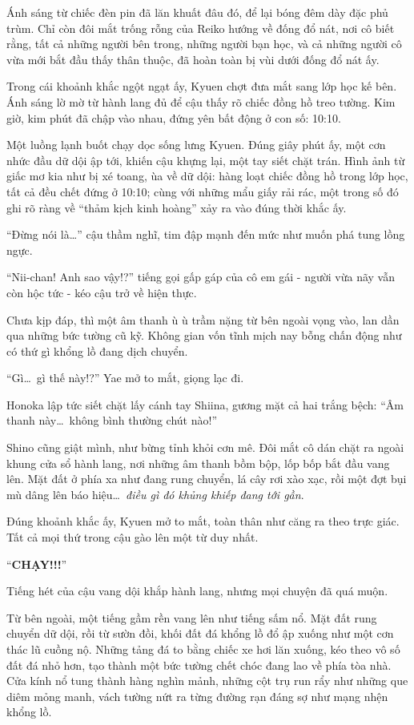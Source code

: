 \documentclass[../main.tex]{subfiles}
\begin{document}
Ánh sáng từ chiếc đèn pin đã lăn khuất đâu đó, để lại bóng đêm dày đặc phủ trùm. Chỉ còn đôi mắt trống rỗng của Reiko hướng về đống đổ nát, nơi cô biết rằng, tất cả những người bên trong, những người bạn học, và cả những người cô vừa mới bắt đầu thấy thân thuộc, đã hoàn toàn bị vùi dưới đống đổ nát ấy.

\il

Trong cái khoảnh khắc ngột ngạt ấy, Kyuen chợt đưa mắt sang lớp học kế bên. Ánh sáng lờ mờ từ hành lang đủ để cậu thấy rõ chiếc đồng hồ treo tường. Kim giờ, kim phút đã chập vào nhau, đứng yên bất động ở con số: 10:10.

Một luồng lạnh buốt chạy dọc sống lưng Kyuen. Đúng giây phút ấy, một cơn nhức đầu dữ dội ập tới, khiến cậu khựng lại, một tay siết chặt trán. Hình ảnh từ giấc mơ kia như bị xé toang, ùa về dữ dội: hàng loạt chiếc đồng hồ trong lớp học, tất cả đều chết đứng ở 10:10; cùng với những mẩu giấy rải rác, một trong số đó ghi rõ ràng về ``thảm kịch kinh hoàng'' xảy ra vào đúng thời khắc ấy.

``Đừng nói là\dots'' cậu thầm nghĩ, tim đập mạnh đến mức như muốn phá tung lồng ngực.

``Nii-chan! Anh sao vậy!?'' tiếng gọi gấp gáp của cô em gái - người vừa nãy vẫn còn hộc tức - kéo cậu trở về hiện thực.

Chưa kịp đáp, thì một âm thanh ù ù trầm nặng từ bên ngoài vọng vào, lan dần qua những bức tường cũ kỹ. Không gian vốn tĩnh mịch nay bỗng chấn động như có thứ gì khổng lồ đang dịch chuyển.

``Gì\dots\ gì thế này!?'' Yae mở to mắt, giọng lạc đi.

Honoka lập tức siết chặt lấy cánh tay Shiina, gương mặt cả hai trắng bệch: ``Âm thanh này\dots\ không bình thường chút nào!''

Shino cũng giật mình, như bừng tỉnh khỏi cơn mê. Đôi mắt cô dán chặt ra ngoài khung cửa sổ hành lang, nơi những âm thanh bồm bộp, lốp bốp bắt đầu vang lên. Mặt đất ở phía xa như đang rung chuyển, lá cây rơi xào xạc, rồi một đợt bụi mù dâng lên báo hiệu\dots\ \emph{điều gì đó khủng khiếp đang tới gần}.

Đúng khoảnh khắc ấy, Kyuen mở to mắt, toàn thân như căng ra theo trực giác. Tất cả mọi thứ trong cậu gào lên một từ duy nhất.

``{\Large{\textbf{CHẠY!!!}}}''

Tiếng hét của cậu vang dội khắp hành lang, nhưng mọi chuyện đã quá muộn.

Từ bên ngoài, một tiếng gầm rền vang lên như tiếng sấm nổ. Mặt đất rung chuyển dữ dội, rồi từ sườn đồi, khối đất đá khổng lồ đổ ập xuống như một cơn thác lũ cuồng nộ. Những tảng đá to bằng chiếc xe hơi lăn xuống, kéo theo vô số đất đá nhỏ hơn, tạo thành một bức tường chết chóc đang lao về phía tòa nhà. Cửa kính nổ tung thành hàng nghìn mảnh, những cột trụ run rẩy như những que diêm mỏng manh, vách tường nứt ra từng đường rạn đáng sợ như mạng nhện khổng lồ.
\end{document}
